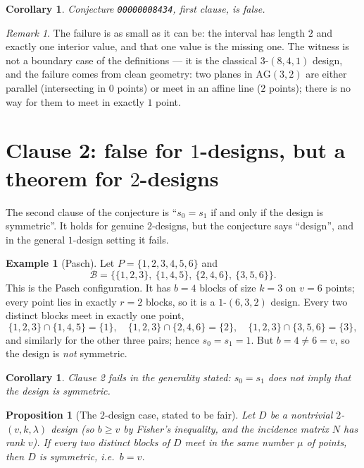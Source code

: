 \documentclass[11pt]{article}
\newtheorem{corollary}[theorem]{Corollary}
\newtheorem{proposition}[theorem]{Proposition}
\theoremstyle{definition}
\newtheorem{example}[theorem]{Example}
\theoremstyle{remark}
\newtheorem{remark}[theorem]{Remark}
\newcommand{\AG}{\mathrm{AG}}
\begin{document}
\begin{corollary}
Conjecture \texttt{00000008434}, first clause, is false.
\end{corollary}

\begin{remark}
The failure is as small as it can be: the interval has length $2$ and exactly
one interior value, and that one value is the missing one. The witness is not
a boundary case of the definitions --- it is the classical
$3$-$(8,4,1)$ design, and the failure comes from clean geometry: two planes in
$\AG(3,2)$ are either parallel (intersecting in $0$ points) or meet in an
affine line ($2$ points); there is no way for them to meet in exactly
$1$ point.
\end{remark}

\section{Clause 2: false for $1$-designs, but a theorem for $2$-designs}

The second clause of the conjecture is ``$s_0 = s_1$ if and only if the
design is symmetric''. It holds for genuine $2$-designs, but the conjecture
says ``design'', and in the general $1$-design setting it fails.

\begin{example}[Pasch]\label{ex:pasch}
Let $P = \{1,2,3,4,5,6\}$ and
\[
\mathcal{B} = \bigl\{\{1,2,3\},\ \{1,4,5\},\ \{2,4,6\},\ \{3,5,6\}\bigr\}.
\]
This is the Pasch configuration. It has $b = 4$ blocks of size $k = 3$ on
$v = 6$ points; every point lies in exactly $r = 2$ blocks, so it is a
$1$-$(6,3,2)$ design. Every two distinct blocks meet in exactly one point,
\[
\{1,2,3\}\cap\{1,4,5\}=\{1\},\quad
\{1,2,3\}\cap\{2,4,6\}=\{2\},\quad
\{1,2,3\}\cap\{3,5,6\}=\{3\},
\]
and similarly for the other three pairs; hence $s_0 = s_1 = 1$. But
$b = 4 \neq 6 = v$, so the design is \emph{not} symmetric.
\end{example}

\begin{corollary}\label{cor:clause2}
Clause 2 fails in the generality stated: $s_0 = s_1$ does not imply that the
design is symmetric.
\end{corollary}

\begin{proposition}[The $2$-design case, stated to be fair]\label{prop:secondclause}
Let $D$ be a nontrivial $2$-$(v,k,\lambda)$ design (so $b \geq v$ by Fisher's
inequality, and the incidence matrix $N$ has rank $v$). If every two distinct
blocks of $D$ meet in the same number $\mu$ of points, then $D$ is symmetric,
i.e.\ $b = v$.
\end{proposition}
\end{document}
